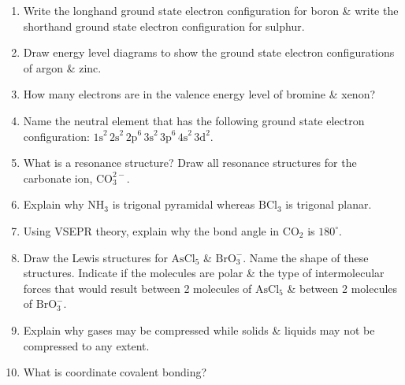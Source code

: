 \documentclass[12pt]{article}
\begin{document}
\begin{enumerate}[label=\arabic*.]
    \item Write the longhand ground state electron configuration for boron \& write the shorthand ground state electron configuration for sulphur.
    \vspace{3cm}

    \item Draw energy level diagrams to show the ground state electron configurations of argon \& zinc.
    \vspace{5cm}

    \item How many electrons are in the valence energy level of bromine \& xenon?
    \vspace{2.5cm}

    \item Name the neutral element that has the following ground state electron configuration: $\text{1s}^2\,\text{2s}^2\,\text{2p}^6\,\text{3s}^2\,\text{3p}^6\,\text{4s}^2\,\text{3d}^2$.
    \vspace{2cm}

    \item What is a resonance structure? Draw all resonance structures for the carbonate ion, $\text{CO}_3^{2-}$.
    \vspace{4.5cm}

    \item Explain why $\text{NH}_3$ is trigonal pyramidal whereas $\text{BCl}_3$ is trigonal planar.
    \vspace{3.5cm}

    \item Using VSEPR theory, explain why the bond angle in $\text{CO}_2$ is $180^\circ$.
    \vspace{3cm}

    \item Draw the Lewis structures for $\text{AsCl}_5$ \& $\text{BrO}_3^-$. Name the shape of these structures. Indicate if the molecules are polar \& the type of intermolecular forces that would result between 2 molecules of $\text{AsCl}_5$ \& between 2 molecules of $\text{BrO}_3^-$.
    \vspace{5cm}

    \item Explain why gases may be compressed while solids \& liquids may not be compressed to any extent.
    \vspace{3cm}

    \item What is coordinate covalent bonding?
    \vspace{2.5cm}


\end{enumerate}
\end{document}
